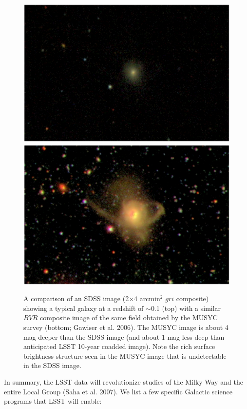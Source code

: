\documentclass{emulateapj}
\begin{document}
\begin{figure}
\vskip -1in
\includegraphics[width=1.0\hsize,clip]{musycSDSS.ps}
\vskip -1.9in
\includegraphics[width=1.0\hsize,clip]{musyc.ps}
\vskip -1in
\caption{
A comparison of an SDSS image (2$\times$4 arcmin$^2$ $gri$ composite) showing a typical galaxy at 
a redshift of $\sim$0.1 (top) with a similar $BVR$ composite image of the same field obtained by the MUSYC survey (bottom; 
Gawiser et al. 2006). The MUSYC image is about 4 mag deeper than the SDSS image (and about 1 mag less deep 
than anticipated LSST 10-year coadded image). Note the rich surface brightness structure seen in the MUSYC 
image that is undetectable in the SDSS image.} 
\label{Fig:musyc}
\end{figure}


In summary, the LSST data will revolutionize studies of the Milky Way and the entire
Local Group (Saha et al. 2007). We list a few specific Galactic science programs that 
LSST will enable: 
\end{document}
